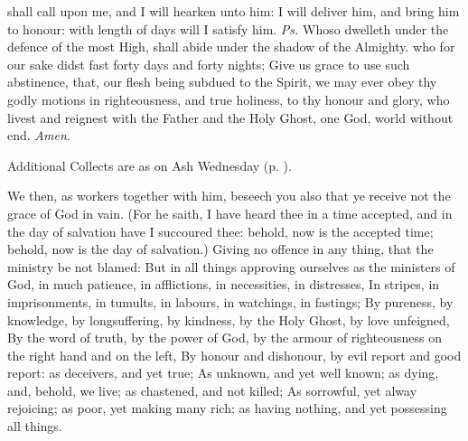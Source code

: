 \introit
{} shall call upon me, and I will hearken unto him: I will deliver him, and bring him to honour: with length of days will I satisfy him. \textit{Ps.} Whoso dwelleth under the defence of the most High, shall abide under the shadow of the Almighty.
\collect
{} who for our sake didst fast forty days and forty nights; Give us grace to use such abstinence, that, our flesh being subdued to the Spirit, we may ever obey thy godly motions in righteousness, and true holiness, to thy honour and glory, who livest and reignest with the Father and the Holy Ghost, one God, world without end. \textit{Amen.}
\begin{rubric}
    Additional Collects are as on Ash Wednesday (p. \pageref{AshWednesdayMassCollect}).
\end{rubric}
 We then, as workers together with him, beseech you also that ye receive not the grace of God in vain. (For he saith, I have heard thee in a time accepted, and in the day of salvation have I succoured thee: behold, now is the accepted time; behold, now is the day of salvation.) Giving no offence in any thing, that the ministry be not blamed: But in all things approving ourselves as the ministers of God, in much patience, in afflictions, in necessities, in distresses, In stripes, in imprisonments, in tumults, in labours, in watchings, in fastings; By pureness, by knowledge, by longsuffering, by kindness, by the Holy Ghost, by love unfeigned, By the word of truth, by the power of God, by the armour of righteousness on the right hand and on the left, By honour and dishonour, by evil report and good report: as deceivers, and yet true; As unknown, and yet well known; as dying, and, behold, we live; as chastened, and not killed; As sorrowful, yet alway rejoicing; as poor, yet making many rich; as having nothing, and yet possessing all things.
